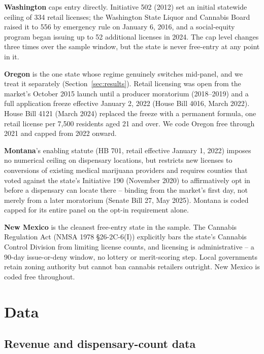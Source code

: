 \documentclass[12pt]{article}
\begin{document}
\textbf{Washington} caps entry directly. Initiative 502 (2012) set an initial statewide ceiling of 334 retail
licenses; the Washington State Liquor and Cannabis Board raised it to 556 by emergency rule on January 6, 2016,
and a social-equity program began issuing up to 52 additional licenses in 2024. The cap level changes three
times over the sample window, but the state is never free-entry at any point in it.

\textbf{Oregon} is the one state whose regime genuinely switches mid-panel, and we treat it separately
(Section~\ref{sec:results}). Retail licensing was open from the market's October 2015 launch until a producer
moratorium (2018--2019) and a full application freeze effective January 2, 2022 (House Bill 4016, March 2022).
House Bill 4121 (March 2024) replaced the freeze with a permanent formula, one retail license per 7,500
residents aged 21 and over. We code Oregon free through 2021 and capped from 2022 onward.

\textbf{Montana}'s enabling statute (HB 701, retail effective January 1, 2022) imposes no numerical ceiling on
dispensary locations, but restricts new licenses to conversions of existing medical marijuana providers and
requires counties that voted against the state's Initiative 190 (November 2020) to affirmatively opt in before
a dispensary can locate there -- binding from the market's first day, not merely from a later moratorium
(Senate Bill 27, May 2025). Montana is coded capped for its entire panel on the opt-in requirement alone.

\textbf{New Mexico} is the cleanest free-entry state in the sample. The Cannabis Regulation Act (NMSA 1978
\S 26-2C-6(I)) explicitly bars the state's Cannabis Control Division from limiting license counts, and
licensing is administrative -- a 90-day issue-or-deny window, no lottery or merit-scoring step. Local
governments retain zoning authority but cannot ban cannabis retailers outright. New Mexico is coded free
throughout.

\section{Data}
\label{sec:data}

\subsection{Revenue and dispensary-count data}
\end{document}
